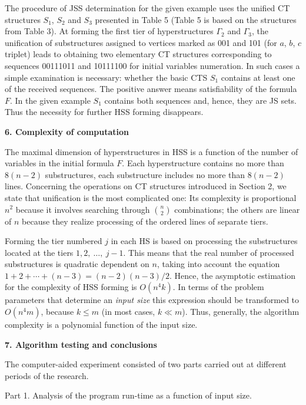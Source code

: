 \documentclass[12pt, a4paper]{article}
\begin{document}
\medskip
The procedure of JSS determination for the given example uses the unified CT structures  $S_1$, $S_2$ and $S_3$ presented in Table 5 (Table 5 is based on the structures from Table 3). At forming the first tier of hyperstructures $\Gamma_2$ and $\Gamma_3$, the unification of substructures assigned to vertices marked as 001 and 101 (for  $a$, $b$, $c$  triplet) leads to obtaining two elementary CT structures corresponding to sequences 00111011 and 10111100 for initial variables numeration. In such cases a simple examination is necessary: whether the basic CTS $S_1$ contains at least one of the received sequences. The positive answer means satisfiability of the formula $F$. In the given example $S_1$ contains both sequences and, hence, they are JS sets. Thus the necessity for further HSS forming disappears.

\medskip
\textbf {6. Complexity of computation}

\smallskip
The maximal dimension of hyperstructures in HSS is a function of the number of variables in the initial formula $F$. Each hyperstructure contains no more than $8(n-2)$ substructures, each substructure includes no more than $8(n-2)$ lines. Concerning the operations on CT structures introduced in Section 2, we state that unification is the most complicated one: Its complexity is proportional $n^2$ because it involves searching through ${n\choose 2}$ combinations; the others are linear of  $n$ because they realize processing of the ordered lines of separate tiers.

Forming the tier numbered  $j$  in each HS is based on processing the substructures located at the tiers $1, 2, \ \dots,\ j-1$. This means that the real number of processed substructures is quadratic
dependent on $n$, taking into account the equation $1+2+ \cdots +(n-3) = (n-2)(n-3)/2$. Hence, the asymptotic estimation for the complexity of HSS forming is $O(n^4k)$. In terms of the problem parameters that determine an {\it input size} this expression should be transformed to $O(n^4m)$, because $k\le m$ (in most cases, $k\ll m$).
Thus, generally, the algorithm complexity is a polynomial function of the input size.

\medskip
\textbf{7. Algorithm testing and conclusions}

\smallskip
The computer-aided experiment consisted of two parts carried out at different periods of the research.

\smallskip
Part 1. Analysis of the program run-time as a function of input size.
\end{document}
